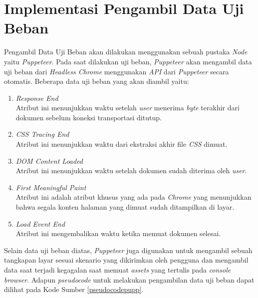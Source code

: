 	\section{Implementasi Pengambil Data Uji Beban}
		Pengambil Data Uji Beban akan dilakukan menggunakan sebuah pustaka \textit{Node} yaitu \textit{Puppeteer}. Pada saat dilakukan uji beban, \textit{Puppeteer} akan mengambil data uji beban dari \textit{Headless Chrome} menggunakan \textit{API} dari \textit{Puppeteer} secara otomatis. Beberapa data uji beban yang akan diambil yaitu:
		\begin{enumerate}
			\item \textit{Response End} \\
				Atribut ini menunjukkan waktu setelah \textit{user} menerima \textit{byte} terakhir dari dokumen sebelum koneksi transportasi ditutup.
			\item \textit{CSS Tracing End} \\
				Atribut ini menunjukkan waktu dari ekstraksi akhir file \textit{CSS} dimuat.
			\item \textit{DOM Content Loaded} \\
				Atribut ini menunjukkan waktu setelah dokumen sudah diterima oleh \textit{user}.
			\item \textit{First Meaningful Paint} \\
				Atribut ini adalah atribut khusus yang ada pada \textit{Chrome} yang menunjukkan bahwa segala konten halaman yang dimuat sudah ditampilkan di layar.
			\item \textit{Load Event End} \\
				Atribut ini mengembalikan waktu ketika memuat dokumen selesai. \\
		\end{enumerate}
	 
	 	\indent Selain data uji beban diatas, \textit{Puppeteer} juga digunakan untuk mengambil sebuah tangkapan layar sesuai skenario yang dikirimkan oleh pengguna dan mengambil data saat terjadi kegagalan saat memuat \textit{assets} yang tertulis pada \textit{console browser}. Adapun \textit{pseudocode} untuk melakukan pengambilan data uji beban dapat dilihat pada Kode Sumber \ref{pseudocodepupp}.
	 	
